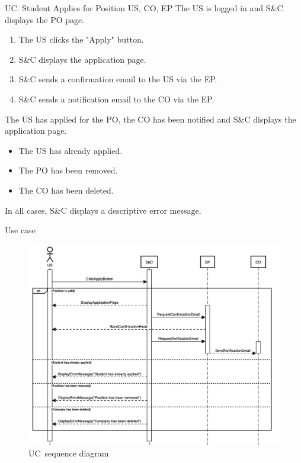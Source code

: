 
\clearpage
\begin{usecase}
    {UC\theuc. Student Applies for Position}
    {US, CO, EP}
    {The US is logged in and S\&C displays the PO page.}
    {\begin{enumerate}[leftmargin=*]
        \item The US clicks the "Apply" button.
        \item S\&C displays the application page.
        \item S\&C sends a confirmation email to the US via the EP.
        \item S\&C sends a notification email to the CO via the EP.
    \end{enumerate}}
    {The US has applied for the PO, the CO has been notified and S\&C displays the application page.}
    {\begin{itemize}[leftmargin=*, label=\tiny\textbullet]
        \item The US has already applied.
        \item The PO has been removed.
        \item The CO has been deleted.
    \end{itemize}
    In all cases, S\&C displays a descriptive error message.}
    {Use case \theuc}
\end{usecase}

\begin{figure}[h]
    \centering
    \includegraphics[width=16cm]{images/sequence-diagrams/student-applies-for-position.png}
    \caption{UC\theuc\ sequence diagram}
\end{figure}

